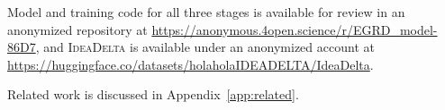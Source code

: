 Model and training code for all three stages is available for review in an
anonymized repository at
\url{https://anonymous.4open.science/r/EGRD_model-86D7}, and \textsc{IdeaDelta}
is available under an anonymized account at
\url{https://huggingface.co/datasets/holaholaIDEADELTA/IdeaDelta}.

Related work is discussed in Appendix~\ref{app:related}.
